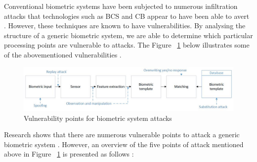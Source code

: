     Conventional biometric systems have been subjected to numerous infiltration attacks that technologies such as BCS and CB appear to have been able to avert \cite{Rathgeb2011}. However, these techniques are known to have vulnerabilities. By analysing the structure of a generic biometric system, we are able to determine which particular processing points are vulnerable to attacks. The Figure ~\ref{fig:Vulnerability points for biometric system attacks} below illustrates some of the abovementioned vulnerabilities \cite{Patel2015}.
    
    
    \begin{figure}[htbp!] 
    \centering    
    \includegraphics[width=1.0\textwidth]{Chapter2/Figs/Vulnerability_points_for_biometric_system_attacks.jpg}
    \caption[Vulnerability points for biometric system attacks]{Vulnerability points for biometric system attacks}
    \label{fig:Vulnerability points for biometric system attacks}
    \end{figure}
    
    Research shows that there are numerous vulnerable points to attack a generic biometric system \cite{Ratha2001}. However, an overview of the five points of attack mentioned above in Figure ~\ref{fig:Vulnerability points for biometric system attacks} is presented as follows \cite{Karimovich2016, Patel2015, Ratha2001, Rathgeb2011}:
    

